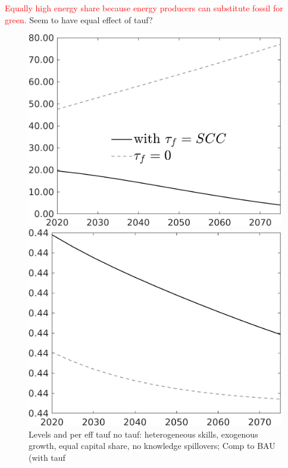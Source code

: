 \documentclass[12pt]{article}
\newcommand{\tr}[1]{\textcolor{red}{#1}}
\begin{document}
\tr{Equally high energy share because energy producers can substitute fossil for green.} Seem to have equal effect of tauf? 
\begin{figure}[h!!]
	\centering
	\caption{Levels and per eff tauf no tauf: heterogeneous skills, exogenous growth, equal capital share, no knowledge spillovers; Comp to BAU (with tauf}\label{fig:Leveltauf_nsk0_xgr1_equalcapShare_noknow_withtaul}
	\begin{minipage}[]{0.32\textwidth}
		\includegraphics[width=1\textwidth]{../../codding_model/own_basedOnFried/optimalPol_010922_revision/figures/all_13Sept22/LevTaufNoTauf_TaulCalib_Equlab_regime0_Emnet_spillover0_nsk0_xgr1_knspil1_sep1_LFlimit0_emsbase0_countec0_GovRev0_etaa0.79_lgd1.png}
	\end{minipage}	
	\begin{minipage}[]{0.32\textwidth}
		\includegraphics[width=1\textwidth]{../../codding_model/own_basedOnFried/optimalPol_010922_revision/figures/all_13Sept22/LevTaufNoTauf_TaulCalib_Equlab_regime0_hh_spillover0_nsk0_xgr1_knspil1_sep1_LFlimit0_emsbase0_countec0_GovRev0_etaa0.79_lgd0.png}

\end{minipage}
\end{figure}
\end{document}
